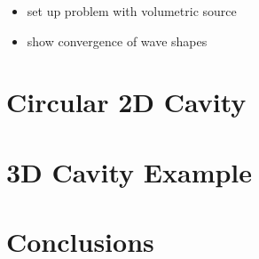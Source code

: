 \begin{itemize}
	\item set up problem with volumetric source
	\item show convergence of wave shapes
\end{itemize}

\chapter{Circular 2D Cavity} %
\label{Chapter3}

\chapter{3D Cavity Example} %
\label{Chapter3}

\chapter{Conclusions} %
